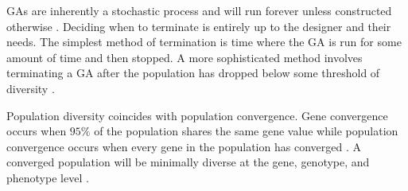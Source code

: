 GAs are inherently a stochastic process and will run forever unless constructed otherwise \cite{ColinReeves}. Deciding when to terminate is entirely up to the designer and their needs. The simplest method of termination is time where the GA is run for some amount of time and then stopped. A more sophisticated method involves terminating a GA after the population has dropped below some threshold of diversity \cite{ColinReeves}. 

Population diversity coincides with population convergence. Gene convergence occurs when $95\%$ of the population shares the same gene value while population convergence occurs when every gene in the population has converged \cite{Beasley93anoverview}. A converged population will be minimally diverse at the gene, genotype, and phenotype level \cite{ColinReeves}.     
